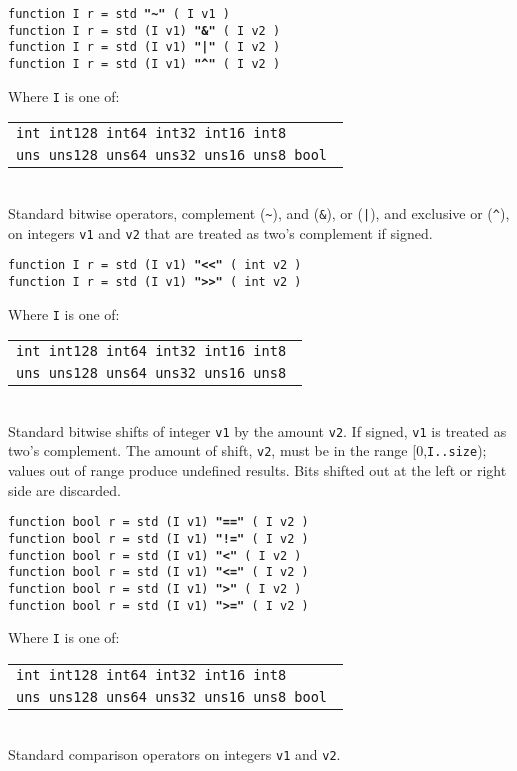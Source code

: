 \documentclass[12pt]{article}
\newcommand{\ttkey}[1]{{\tt \bfseries #1}}
\newenvironment{indpar}[1][0.3in]%
	{\begin{list}{}%
		     {\setlength{\itemsep}{0in}%
		      \setlength{\topsep}{0in}%
		      \setlength{\parsep}{1ex}%
		      \setlength{\labelwidth}{#1}%
		      \setlength{\leftmargin}{#1}%
		      \addtolength{\leftmargin}{\labelsep}}%
	 \item}%
	{\end{list}}
\begin{document}
{\tt function I r = std        \ttkey{"\textasciitilde"} ( I v1 )} \\
{\tt function I r = std (I v1) \ttkey{"\&"} ( I v2 )} \\
{\tt function I r = std (I v1) \ttkey{"|"} ( I v2 )} \\
{\tt function I r = std (I v1) \ttkey{"\textasciicircum"} ( I v2 )}
\begin{indpar}
Where {\tt I} is one of:
	\begin{tabular}[t]{l}
	\tt int  int128 int64  int32  int16 int8 \\
	\tt uns  uns128 uns64  uns32  uns16 uns8 bool \\
	\end{tabular}
\\[1ex]
Standard bitwise operators, complement ({\tt \textasciitilde}),
and ({\tt \&}), or ({\tt |}), and exclusive or ({\tt \textasciicircum}),
on integers {\tt v1} and {\tt v2}
that are treated as two's complement if signed.
\end{indpar}

{\tt function I r = std (I v1) \ttkey{"<{}<"} ( int v2 )} \\
{\tt function I r = std (I v1) \ttkey{">{}>"} ( int v2 )}
\begin{indpar}
Where {\tt I} is one of:
	\begin{tabular}[t]{l}
	\tt int  int128 int64  int32  int16 int8 \\
	\tt uns  uns128 uns64  uns32  uns16 uns8 \\
	\end{tabular}
\\[1ex]
Standard bitwise shifts of integer {\tt v1} by the amount {\tt v2}.
If signed, {\tt v1} is treated as two's complement.
The amount of shift, {\tt v2}, must be in the range
[0,{\tt I..size}); values out of range produce undefined results.
Bits shifted out at the left or
right side are discarded.
\end{indpar}

{\tt function bool r = std (I v1) \ttkey{"=="} ( I v2 )} \\
{\tt function bool r = std (I v1) \ttkey{"!="} ( I v2 )} \\
{\tt function bool r = std (I v1) \ttkey{"<"} ( I v2 )} \\
{\tt function bool r = std (I v1) \ttkey{"<="} ( I v2 )} \\
{\tt function bool r = std (I v1) \ttkey{">"} ( I v2 )} \\
{\tt function bool r = std (I v1) \ttkey{">="} ( I v2 )}
\begin{indpar}
Where {\tt I} is one of:
	\begin{tabular}[t]{l}
	\tt int  int128 int64  int32  int16 int8 \\
	\tt uns  uns128 uns64  uns32  uns16 uns8 bool \\
	\end{tabular}
\\[1ex]
Standard comparison operators on integers {\tt v1} and {\tt v2}.
\end{indpar}
\end{document}
